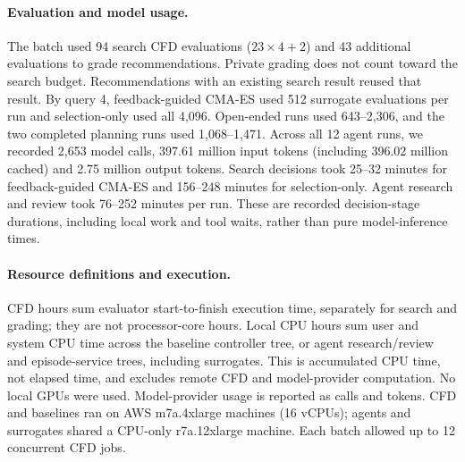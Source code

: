\paragraph{Evaluation and model usage.}
The batch used 94 search CFD evaluations ($23\times4+2$) and 43 additional
evaluations to grade recommendations. Private grading does not count toward
the search budget. Recommendations with an existing search result reused
that result. By query 4, feedback-guided CMA-ES used 512 surrogate evaluations
per run and selection-only used all 4{,}096. Open-ended runs used
643--2{,}306, and the two completed planning runs used 1{,}068--1{,}471.
Across all 12 agent runs, we recorded 2{,}653 model calls, 397.61 million
input tokens (including 396.02 million cached) and 2.75 million output tokens.
Search decisions took 25--32 minutes for feedback-guided CMA-ES and
156--248 minutes for selection-only. Agent research and review took
76--252 minutes per run. These are recorded decision-stage durations,
including local work and tool waits, rather than pure model-inference times.

\paragraph{Resource definitions and execution.}
CFD hours sum evaluator start-to-finish execution time, separately for search
and grading; they are not processor-core hours. Local CPU hours sum user and
system CPU time across the baseline controller tree, or agent research/review
and episode-service trees, including surrogates. This is accumulated CPU time,
not elapsed time, and excludes remote CFD and model-provider computation.
No local GPUs were used. Model-provider usage is reported as calls and tokens.
CFD and baselines ran on AWS m7a.4xlarge machines (16 vCPUs); agents and
surrogates shared a CPU-only r7a.12xlarge machine. Each batch allowed up to
12 concurrent CFD jobs.
